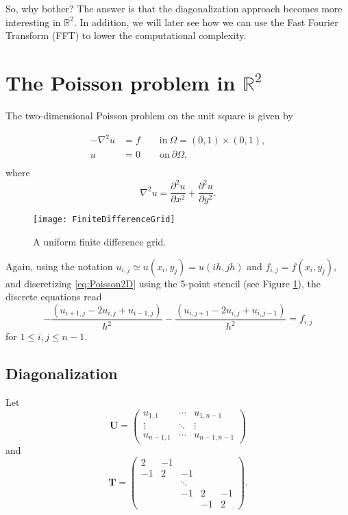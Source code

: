 So, why bother? The answer is that the diagonalization approach becomes more
interesting in $\mathbb{R}^2$. In addition, we will later see how we can use the
Fast Fourier Transform (FFT) to lower the computational complexity.

\section{The Poisson problem in $\mathbb{R}^2$}

The two-dimensional Poisson problem on the unit square is given by

\begin{equation}
  \begin{split}
    -\nabla^2 u &= f \qquad \text{in} ~ \Omega=(0,1) \times (0,1), \\
    u &= 0 \qquad \text{on} ~ \partial \Omega, \\
  \end{split}
  \label{eq:Poisson2D}
\end{equation}
where
\[
  \nabla^2 u = \frac{\partial^2 u}{\partial x^2}
  + \frac{\partial^2 u}{\partial y^2}.
\]

\begin{figure}
  \centering
  \texttt{[image: FiniteDifferenceGrid]}
    \caption{A uniform finite difference grid.}
  \label{fig:FDM_grid_2D}
\end{figure}

Again, using the notation $u_{i,j} \simeq u(x_i,y_j) = u(i h, j h)$ and
$f_{i,j}=f(x_i,y_j)$, and discretizing \eqref{eq:Poisson2D} using the 5-point
stencil (see Figure \ref{fig:FDM_grid_2D}), the discrete equations read
\begin{equation}
  -\frac{(u_{i+1,j}-2u_{i,j}+u_{i-1,j})}{h^2} - \frac{(u_{i,j+1}-2u_{i,j}+u_{i,j-1})}{h^2} = f_{i,j}
  \label{eq:FDM_sys}
\end{equation}
for $1 \leq i,j \leq n-1$.

\subsection{Diagonalization}

Let
\begin{equation*}
  \bm U =
  \begin{pmatrix}
    u_{1,1} & \cdots & u_{1,n-1} \\
    \vdots & \ddots & \vdots \\
    u_{n-1,1} & \cdots & u_{n-1,n-1}
  \end{pmatrix}
\end{equation*}
and
\begin{equation*}
  \bm T =
  \begin{pmatrix}
    2 & -1 & & & \\
    -1 & 2 & -1 & & \\
    & & \ddots & & \\
    & & -1 & 2 & -1 \\
    & & & -1 & 2
  \end{pmatrix}.
\end{equation*}

